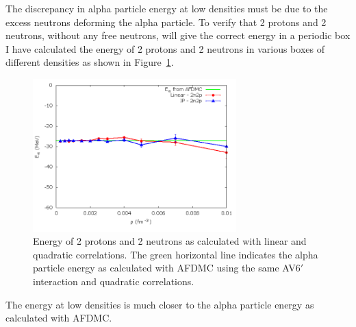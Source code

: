 The discrepancy in alpha particle energy at low densities must be due to the excess neutrons deforming the alpha particle. To verify that 2 protons and 2 neutrons, without any free neutrons, will give the correct energy in a periodic box I have calculated the energy of 2 protons and 2 neutrons in various boxes of different densities as shown in Figure~\ref{fig:alpha2n2p}.
\begin{figure}[h!]
   \centering
   \includegraphics[width=0.7\textwidth]{figures/2n2p.png}
   \caption{Energy of 2 protons and 2 neutrons as calculated with linear and quadratic correlations. The green horizontal line indicates the alpha particle energy as calculated with AFDMC using the same AV6$'$ interaction and quadratic correlations.}
   \label{fig:alpha2n2p}
\end{figure}
The energy at low densities is much closer to the alpha particle energy as calculated with AFDMC.

